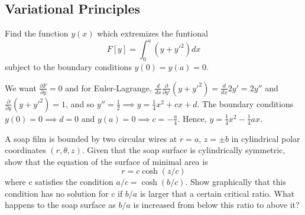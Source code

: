 \documentclass[a4paper]{article}
\begin{document}
\subsection*{Variational Principles}
\begin{qns}
Find the function $y(x)$ which extremizes the funtional
$$F[y]=\int_0^a(y+y'^2)dx$$
subject to the boundary conditions $y(0)=y(a)=0$.
\end{qns}
\begin{ans}
We want $\frac{\partial F}{\partial y}=0$ and for Euler-Lagrange, $\frac{d}{dx}\frac{\partial}{\partial y'}(y+y'^2)=\frac{d}{dx}2y'=2y''$ and $\frac{\partial}{\partial y}(y+y'^2)=1$, and so $y''=\frac{1}{2}\implies y=\frac{1}{4}x^2+cx+d$. The boundary conditions $y(0)=0\implies d=0$ and $y(a)=0\implies c=-\frac{a}{4}$. Hence, $y=\frac{1}{4}x^2-\frac{1}{4}ax$.  
\end{ans}
\begin{qns}
A soap film is bounded by two circular wires at $r = a$, $z =\pm b$ in cylindrical polar coordinates $(r,\theta,z)$. Given that the soap surface is cylindrically symmetric, show that the equation of the surface of minimal area is
$$r=c\cosh(z/c)$$
where c satisfies the condition $a/c=\cosh(b/c)$. Show graphically that this condition has no solution for $c$ if $b/a$ is larger that a certain critical ratio. What happens to the soap surface as $b/a$ is increased from below this ratio to above it?
\end{qns}
\end{document}

